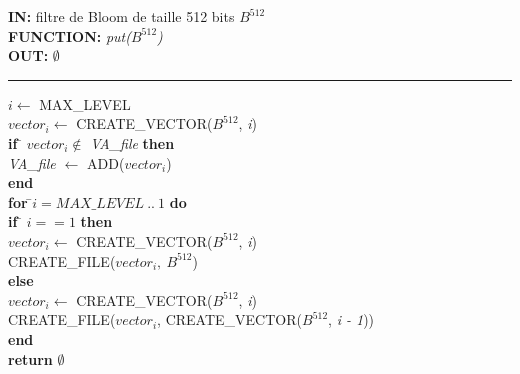 \begin{flushleft}
	\begin{framed}
		\textbf{IN:} filtre de Bloom de taille 512 bits $B^{512}$\\
		\textbf{FUNCTION:} \textit{put($B^{512}$)}\\
		\textbf{OUT:} \textit{$\emptyset$}\\

		\noindent\rule{\linewidth}{0.5pt}

		\begin{tabbing}
			$i \leftarrow$ MAX\_LEVEL\\
			$vector_i \leftarrow$ CREATE\_VECTOR($B^{512}$, \textit{i})\\
			\textbf{if }\= $vector_i \notin$ \textit{VA\_file} \textbf{then}\\
					\> \textit{VA\_file $\leftarrow$} ADD($vector_i$)\\
			\textbf{end}	\\	
			\textbf{for }\=$i = MAX\_LEVEL\ ..\ 1$ \textbf{do}\\
					\> \textbf{if }\= $i == 1$ \textbf{then}\\
					\> 	\> $vector_i \leftarrow$ CREATE\_VECTOR($B^{512}$, \textit{i})\\
					\>	\> CREATE\_FILE($vector_i,\ B^{512}$)\\
					\> \textbf{else}\\
					\>	\> $vector_i \leftarrow$ CREATE\_VECTOR($B^{512}$, \textit{i})\\
					\>	\> CREATE\_FILE($vector_i$, CREATE\_VECTOR($B^{512}$, \textit{i - 1}))\\
			\textbf{end}	\\	
			\textbf{return} $\emptyset$\\
	    	\end{tabbing}		
	\end{framed}
\end{flushleft}











